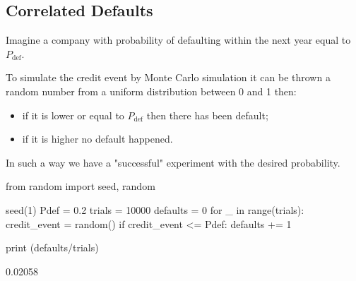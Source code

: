 





    


\subsection{Correlated Defaults}

Imagine a company with probability of defaulting within the next year equal to $P_{\mathrm{def}}$.

To simulate the credit event by Monte Carlo simulation it can be thrown a random number from a uniform distribution between 0 and 1  then:
\begin{itemize}
\item if it is lower or equal to $P_{\mathrm{def}}$ then there has been default;
\item if it is higher no default happened.
\end{itemize}

In such a way we have a "successful" experiment with the desired probability.

\begin{ipython}
from random import seed, random

seed(1)
Pdef = 0.2
trials = 10000
defaults = 0
for _ in range(trials):
    credit_event = random()
    if credit_event <= Pdef:
        defaults += 1

print (defaults/trials)
\end{ipython}
\begin{ioutput}
0.02058
\end{ioutput}

